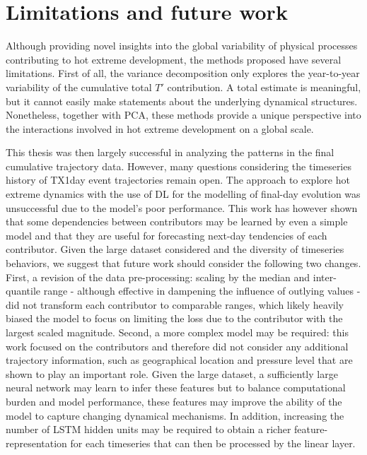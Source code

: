 \documentclass[11pt,a4paper,twoside,openright]{report}
\theoremstyle{definition}
\begin{document}
\section{Limitations and future work}\label{limitations-and-future-work}

Although providing novel insights into the global variability of physical processes contributing to hot extreme development, the methods proposed have several limitations. First of all, the variance decomposition only explores the year-to-year variability of the cumulative total \(T'\) contribution. A total estimate is meaningful, but it cannot easily make statements about the underlying dynamical structures. Nonetheless, together with PCA, these methods provide a unique perspective into the interactions involved in hot extreme development on a global scale.

This thesis was then largely successful in analyzing the patterns in the final cumulative trajectory data. However, many questions considering the timeseries history of TX1day event trajectories remain open. The approach to explore hot extreme dynamics with the use of DL for the modelling of final-day evolution was unsuccessful due to the model's poor performance. This work has however shown that some dependencies between contributors may be learned by even a simple model and that they are useful for forecasting next-day tendencies of each contributor. Given the large dataset considered and the diversity of timeseries behaviors, we suggest that future work should consider the following two changes. First, a revision of the data pre-processing: scaling by the median and inter-quantile range - although effective in dampening the influence of outlying values - did not transform each contributor to comparable ranges, which likely heavily biased the model to focus on limiting the loss due to the contributor with the largest scaled magnitude. Second, a more complex model may be required: this work focused on the contributors and therefore did not consider any additional trajectory information, such as geographical location and pressure level that are shown to play an important role. Given the large dataset, a sufficiently large neural network may learn to infer these features but to balance computational burden and model performance, these features may improve the ability of the model to capture changing dynamical mechanisms. In addition, increasing the number of LSTM hidden units may be required to obtain a richer feature-representation for each timeseries that can then be processed by the linear layer.
\end{document}

